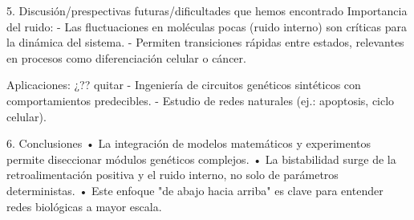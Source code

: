 5. Discusión/prespectivas futuras/dificultades que hemos encontrado
Importancia del ruido:
- Las fluctuaciones en moléculas pocas (ruido interno) son críticas para la dinámica del sistema.
- Permiten transiciones rápidas entre estados, relevantes en procesos como diferenciación celular o cáncer.

Aplicaciones: ¿?? quitar
- Ingeniería de circuitos genéticos sintéticos con comportamientos predecibles.
- Estudio de redes naturales (ej.: apoptosis, ciclo celular).

6. Conclusiones
•	La integración de modelos matemáticos y experimentos permite diseccionar módulos genéticos complejos.
•	La bistabilidad surge de la retroalimentación positiva y el ruido interno, no solo de parámetros deterministas.
•	Este enfoque "de abajo hacia arriba" es clave para entender redes biológicas a mayor escala.




